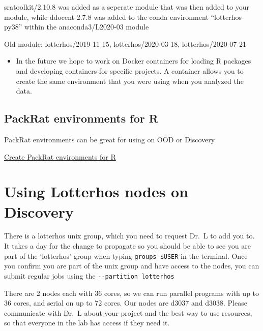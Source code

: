 \documentclass[
  letterpaper,
  DIV=11,
  numbers=noendperiod]{scrreprt}
\providecommand{\tightlist}{%
  \setlength{\itemsep}{0pt}\setlength{\parskip}{0pt}}\usepackage{longtable,booktabs,array}
\begin{document}
sratoolkit/2.10.8 was added as a seperate module that was then added to
your module, while ddocent-2.7.8 was added to the conda environment
``lotterhos-py38'' within the anaconda3/L2020-03 module

Old module: lotterhos/2019-11-15, lotterhos/2020-03-18,
lotterhos/2020-07-21

\begin{itemize}
\tightlist
\item
  In the future we hope to work on Docker containers for loading R
  packages and developing containers for specific projects. A container
  allows you to create the same environment that you were using when you
  analyzed the data.
\end{itemize}

\hypertarget{packrat-environments-for-r}{%
\subsection*{\texorpdfstring{\textbf{PackRat environments for
R}}{PackRat environments for R}}\label{packrat-environments-for-r}}

PackRat environments can be great for using on OOD or Discovery

\href{https://rc-docs.northeastern.edu/en/latest/software/software.html}{Create
PackRat environments for R}

\hypertarget{using-lotterhos-nodes-on-discovery}{%
\section*{\texorpdfstring{\textbf{Using Lotterhos nodes on
Discovery}}{Using Lotterhos nodes on Discovery}}\label{using-lotterhos-nodes-on-discovery}}

There is a lotterhos unix group, which you need to request Dr.~L to add
you to. It takes a day for the change to propagate so you should be able
to see you are part of the `lotterhos' group when typing
\texttt{groups\ \$USER} in the terminal. Once you confirm you are part
of the unix group and have access to the nodes, you can submit regular
jobs using the \texttt{-\/-partition\ lotterhos}

There are 2 nodes each with 36 cores, so we can run parallel programs
with up to 36 cores, and serial on up to 72 cores. Our nodes are d3037
and d3038. Please communicate with Dr.~L about your project and the best
way to use resources, so that everyone in the lab has access if they
need it.
\end{document}
